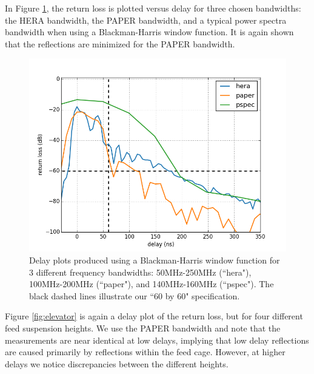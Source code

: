 \documentclass[12pt,preprint]{aastex}
\begin{document}
In Figure \ref{fig:3bands}, the return loss is plotted versus delay for three chosen bandwidths: the HERA bandwidth, the PAPER bandwidth, and a typical power spectra bandwidth when using a Blackman-Harris window function. It is again shown that the reflections are minimized for the PAPER bandwidth. 

\begin{figure}
\centering
\includegraphics[totalheight=0.5\textheight]{plots/delay3_window.png}
\caption{Delay plots produced using a Blackman-Harris window function for 3 different frequency bandwidths: 50MHz-250MHz (``hera"), 100MHz-200MHz (``paper"), and 140MHz-160MHz (``pspec"). The black dashed lines illustrate our ``60 by 60" specification.}
\label{fig:3bands}
\end{figure}

Figure \ref{fig:elevator} is again a delay plot of the return loss, but for four different feed suspension heights. We use the PAPER bandwidth and note that the measurements are near identical at low delays, implying that low delay reflections are caused primarily by reflections within the feed cage. However, at higher delays we notice discrepancies between the different heights.
\end{document}
